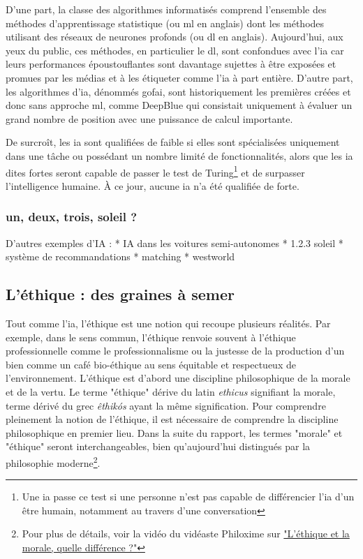 D'une part, la classe des algorithmes informatisés comprend l'ensemble des méthodes d'apprentissage statistique (ou \gls{ml} en anglais) dont les méthodes utilisant des réseaux de neurones profonds (ou \gls{dl} en anglais). Aujourd'hui, aux yeux du public, ces méthodes, en particulier le \gls{dl}, sont confondues avec l'\gls{ia} car leurs performances époustouflantes sont davantage sujettes à être exposées et promues par les médias et à les étiqueter comme l'\gls{ia} à part entière. D'autre part, les algorithmes d'\gls{ia}, dénommés \gls{gofai}, sont historiquement les premières créées et donc sans approche \gls{ml}, comme DeepBlue qui consistait uniquement à évaluer un grand nombre de position avec une puissance de calcul importante.

De surcroît, les \gls{ia} sont qualifiées de faible si elles sont spécialisées uniquement dans une tâche ou possédant un nombre limité de fonctionnalités, alors que les \gls{ia} dites fortes seront capable de passer le test de Turing\footnote{Une \gls{ia} passe ce test si une personne n'est pas capable de différencier l'\gls{ia} d'un être humain, notamment au travers d'une conversation} et de surpasser l'intelligence humaine. À ce jour, aucune \gls{ia} n'a été qualifiée de forte.

\subsubsection{un, deux, trois, soleil ?}


D'autres exemples d'IA :
* IA dans les voitures semi-autonomes
* 1.2.3 soleil
* système de recommandations
* matching
* westworld




\subsection{L'éthique : des graines à semer}\label{subsection:ethique}

Tout comme l'\gls{ia}, l'éthique est une notion qui recoupe plusieurs réalités. Par exemple, dans le sens commun, l'éthique renvoie souvent à l'éthique professionnelle comme le professionnalisme ou la justesse de la production d'un bien comme un café bio-éthique au sens équitable et respectueux de l'environnement.
L'éthique est d'abord une discipline philosophique de la morale et de la vertu. Le terme "éthique" dérive du latin \textit{ethicus} signifiant la morale, terme dérivé du grec \textit{êthikós} ayant la même signification. Pour comprendre pleinement la notion de l'éthique, il est nécessaire de comprendre la discipline philosophique en premier lieu. Dans la suite du rapport, les termes "morale" et "éthique" seront interchangeables, bien qu'aujourd'hui distingués par la philosophie moderne\footnote{Pour plus de détails, voir la vidéo du vidéaste Philoxime sur  \href{https://tournesol.app/entities/yt:HTAXqpMKm8M}{"L'éthique et la morale, quelle différence ?"}}.

